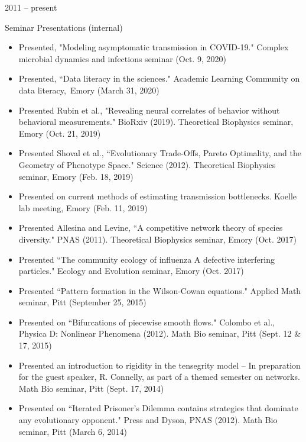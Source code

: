 \documentclass[a4paper,10pt]{article}
\newlength{\cvcolumngapwidth}
\newlength{\cvleftcolumnwidth}
\newlength{\cvrightcolumnwidth}
\newcommand{\cvtitlestyle}[1]{{\large\cvtitlefont\textcolor{cvtitlecolor}{#1}}}
\newcommand{\cvdurationstyle}[1]{{\small\cvdurationfont\textcolor{cvdurationcolor}{#1}}}
\newlength{\cvafteritemskipamount}
\newlength{\cvaftertitleskipamount}
\newlength{\cvparskip}
\newcommand{\cvitem}[2]{
            \begin{minipage}[t]{\cvleftcolumnwidth}
                \raggedleft #1
            \end{minipage}%
            \hspace{\cvcolumngapwidth}%
            \begin{minipage}[t]{\cvrightcolumnwidth}
                \setlength{\parskip}{\cvparskip} #2
            \end{minipage}
        
            \vspace{\cvafteritemskipamount}
        }
\newcommand{\cvtitle}[1]{
            \cvtitlestyle{#1}
        
            \vspace{\cvaftertitleskipamount}
            \vspace{-\cvparskip}
        }
\begin{document}
        \cvitem{
            \cvdurationstyle{2011 -- present}
        }{
            \cvtitle{Seminar Presentations (internal)}
            \begin{itemize}[leftmargin=*]
        	\item Presented, "Modeling asymptomatic transmission in COVID-19." Complex microbial dynamics and infections seminar (Oct. 9, 2020)
            	\item Presented, ``Data literacy in the sciences."  Academic Learning Community on data literacy,\, Emory (March 31, 2020)
            	\item Presented Rubin et al., "Revealing neural correlates of behavior without behavioral measurements." BioRxiv (2019). Theoretical Biophysics seminar, Emory (Oct. 21, 2019)
                \item Presented Shoval et al., ``Evolutionary Trade-Offs, Pareto Optimality, and the Geometry of Phenotype Space." Science (2012). Theoretical Biophysics seminar, Emory (Feb. 18, 2019)
                \item Presented on current methods of estimating transmission bottlenecks. Koelle lab meeting, Emory (Feb. 11, 2019)
                \item Presented Allesina and Levine, ``A competitive network theory of species diversity." PNAS (2011). Theoretical Biophysics seminar, Emory (Oct. 2017)
                \item Presented  ``The community ecology of influenza A defective interfering particles." Ecology and Evolution seminar, Emory (Oct. 2017)
            \end{itemize}
            \begin{itemize}[leftmargin=*]
                \item Presented ``Pattern formation in the Wilson-Cowan equations." Applied Math seminar, Pitt (September 25, 2015)
                \item Presented on ``Bifurcations of piecewise smooth flows." Colombo et al., Physica D: Nonlinear Phenomena (2012). Math Bio seminar, Pitt (Sept. 12 \& 17, 2015)
                \item Presented an introduction to rigidity in the tensegrity model -- In preparation for the guest speaker, R. Connelly, as part of a themed semester on networks. Math Bio seminar, Pitt (Sept. 17, 2014)
                \item Presented on ``Iterated Prisoner's Dilemma contains strategies that dominate any evolutionary opponent." Press and Dyson, PNAS (2012). Math Bio seminar, Pitt (March 6, 2014)

\end{itemize}}
\end{document}
